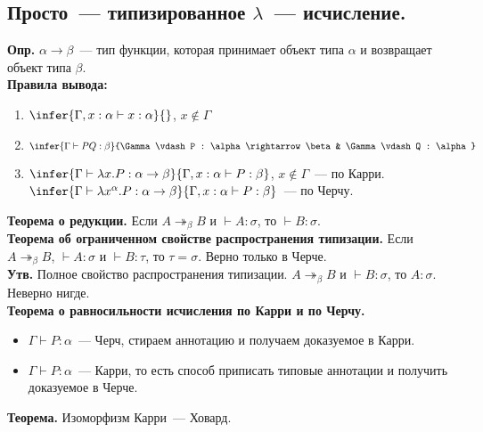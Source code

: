 \documentclass[12pt]{article}
\begin{document}
	\subsection{Просто~--- типизированное $\lambda$~--- исчисление.}
	\textbf{Опр.} $\alpha \rightarrow \beta$~--- тип функции, которая принимает объект типа $\alpha$ и возвращает объект типа $\beta$. \\
	\textbf{Правила вывода:}
	\begin{enumerate}
		\item $\infer{\Gamma, x : \alpha \vdash x : \alpha}{}$, $x \not\in \Gamma$
		\item $\infer{\Gamma \vdash P Q : \beta}{\Gamma \vdash P : \alpha \rightarrow \beta & \Gamma \vdash Q : \alpha}$
		\item $\infer{\Gamma \vdash \lambda x. P : \alpha \rightarrow \beta}{\Gamma, x : \alpha \vdash P : \beta}$, $x \not\in \Gamma$~--- по Карри. \\
		$\infer{\Gamma \vdash \lambda x^{\alpha}. P : \alpha \rightarrow \beta}{\Gamma, x : \alpha \vdash P : \beta}$~--- по Черчу.
	\end{enumerate}
	\textbf{Теорема о редукции.} Если $A \twoheadrightarrow_{\beta} B$ и $\vdash A : \sigma$, то $\vdash B : \sigma$. \\
	\textbf{Теорема об ограниченном свойстве распространения типизации.} Если $A \twoheadrightarrow_{\beta} B$, $\vdash A : \sigma$ и $\vdash B : \tau$, то $\tau = \sigma$. Верно только в Черче. \\
	\textbf{Утв.} Полное свойство распространения типизации. $A \twoheadrightarrow_{\beta} B$ и $\vdash B : \sigma$, то $A : \sigma$. Неверно нигде. \\
	\textbf{Теорема о равносильности исчисления по Карри и по Черчу.}
	\begin{itemize}
		\item $\Gamma \vdash P : \alpha$~--- Черч, стираем аннотацию и получаем доказуемое в Карри.
		\item $\Gamma \vdash P : \alpha$~--- Карри, то есть способ приписать типовые аннотации и получить доказуемое в Черче.
	\end{itemize}
	\textbf{Теорема.} Изоморфизм Карри~--- Ховард.
\end{document}
